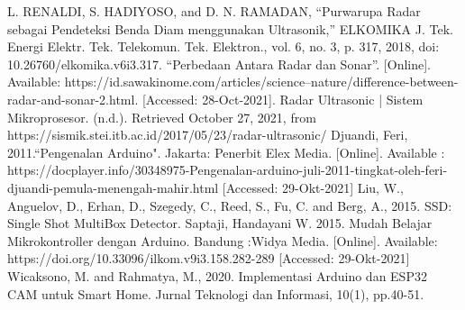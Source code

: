 \documentclass[conference]{IEEEtran}
\begin{document}
\newpage
\begin{thebibliography}{00}
 L. RENALDI, S. HADIYOSO, and D. N. RAMADAN, “Purwarupa Radar sebagai Pendeteksi Benda Diam menggunakan Ultrasonik,” ELKOMIKA J. Tek. Energi Elektr. Tek. Telekomun. Tek. Elektron., vol. 6, no. 3, p. 317, 2018, doi: 10.26760/elkomika.v6i3.317.
 “Perbedaan Antara Radar dan Sonar”. [Online]. Available: https://id.sawakinome.com/articles/science--nature/difference-between-radar-and-sonar-2.html. [Accessed: 28-Oct-2021].
 Radar Ultrasonic | Sistem Mikroprosesor. (n.d.). Retrieved October 27, 2021, from https://sismik.stei.itb.ac.id/2017/05/23/radar-ultrasonic/
 Djuandi, Feri, 2011.“Pengenalan Arduino". Jakarta: Penerbit Elex Media. [Online]. Available : https://docplayer.info/30348975-Pengenalan-arduino-juli-2011-tingkat-oleh-feri-djuandi-pemula-menengah-mahir.html [Accessed: 29-Okt-2021]
 Liu, W., Anguelov, D., Erhan, D., Szegedy, C., Reed, S., Fu, C. and Berg, A., 2015. SSD: Single Shot MultiBox Detector.
 Saptaji, Handayani W. 2015. Mudah Belajar Mikrokontroller dengan Arduino. Bandung :Widya Media. [Online]. Available: https://doi.org/10.33096/ilkom.v9i3.158.282-289 [Accessed: 29-Okt-2021]
 Wicaksono, M. and Rahmatya, M., 2020. Implementasi Arduino dan ESP32 CAM untuk Smart Home. Jurnal Teknologi dan Informasi, 10(1), pp.40-51.
\end{thebibliography}
\end{document}
